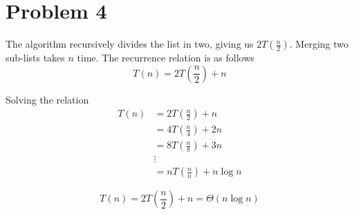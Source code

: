 \documentclass{article}
\newenvironment{problem}[1]{
  \nobreak\section*{Problem #1}
}{}
\newcommand*{\bigTheta}[1]{\ensuremath{\Theta\left(#1\right)}}
\begin{document}
  \begin{problem}{4}
    The algorithm recursively divides the list in two, giving
    us $2T\left(\frac{n}{2}\right)$.  Merging two sub-lists takes
    $n$ time. The recurrence relation is as follows
    \begin{displaymath}
      T(n) = 2T\left(\frac{n}{2}\right) + n
    \end{displaymath}

    Solving the relation
    \begin{displaymath}
      \begin{split}
        T(n) & = 2T\left(\frac{n}{2}\right) + n \\
        & = 4T\left(\frac{n}{4}\right) + 2n \\
        & = 8T\left(\frac{n}{8}\right) + 3n \\
        & \vdots \\
        & = nT\left(\frac{n}{n}\right) + n\log n
      \end{split}
    \end{displaymath}

    \begin{displaymath}
      T(n) = 2T\left(\frac{n}{2}\right) + n = \bigTheta{n\log{n}}
    \end{displaymath}
  \end{problem}
\end{document}

